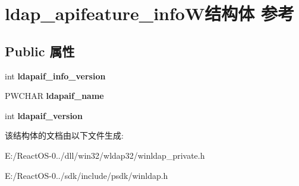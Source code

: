 \hypertarget{structldap__apifeature__info_w}{}\section{ldap\+\_\+apifeature\+\_\+info\+W结构体 参考}
\label{structldap__apifeature__info_w}
\subsection*{Public 属性}
\begin{DoxyCompactItemize}
\item 
\mbox{\label{structldap__apifeature__info_w_a5cd6f2599425798906178c464e07fa43}} 
int {\bfseries ldapaif\+\_\+info\+\_\+version}
\item 
\mbox{\label{structldap__apifeature__info_w_a7921b48b85cc24519b181e289510e28f}} 
P\+W\+C\+H\+AR {\bfseries ldapaif\+\_\+name}
\item 
\mbox{\label{structldap__apifeature__info_w_a42eed979d6bd158a00f01c7704b1cc0f}} 
int {\bfseries ldapaif\+\_\+version}
\end{DoxyCompactItemize}


该结构体的文档由以下文件生成\+:\begin{DoxyCompactItemize}
\item 
E\+:/\+React\+O\+S-\/0../dll/win32/wldap32/winldap\+\_\+private.\+h\item 
E\+:/\+React\+O\+S-\/0../sdk/include/psdk/winldap.\+h\end{DoxyCompactItemize}

